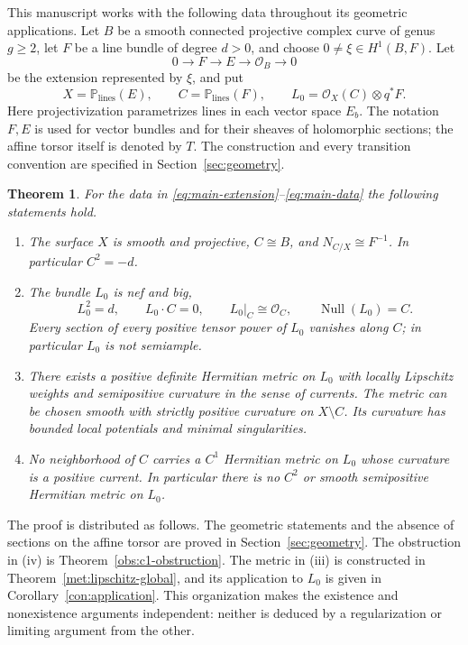 \documentclass[11pt,a4paper]{article}
\numberwithin{equation}{section}
\newtheorem{theorem}{Theorem}[section]
\theoremstyle{definition}
\theoremstyle{remark}
\renewcommand{\P}{\mathbb P}
\newcommand{\OO}{\mathcal O}
\DeclareMathOperator{\Null}{Null}
\begin{document}
This manuscript works with the following data throughout its geometric
applications. Let $B$ be a smooth connected projective complex curve of
genus $g\ge2$, let $F$ be a line bundle of degree $d>0$, and choose
$0\ne\xi\in H^1(B,F)$. Let
\begin{equation}\label{eq:main-extension}
0\longrightarrow F\longrightarrow E\longrightarrow\OO_B\longrightarrow0
\end{equation}
be the extension represented by $\xi$, and put
\begin{equation}\label{eq:main-data}
 X=\P_{\mathrm{lines}}(E),\qquad C=\P_{\mathrm{lines}}(F),\qquad
 L_0=\OO_X(C)\otimes q^*F.
\end{equation}
Here projectivization parametrizes lines in each vector space $E_b$.
The notation $F,E$ is used for vector bundles and for their sheaves of
holomorphic sections; the affine torsor itself is denoted by $T$.
The construction and every transition convention are specified in
Section~\ref{sec:geometry}.

\begin{theorem}\label{main:regularity}
For the data in \eqref{eq:main-extension}--\eqref{eq:main-data} the following
statements hold.
\begin{enumerate}[label=\textup{(\roman*)}]
\item The surface $X$ is smooth and projective, $C\cong B$, and
$N_{C/X}\cong F^{-1}$. In particular $C^2=-d$.
\item The bundle $L_0$ is nef and big,
\[
L_0^2=d,\qquad L_0\cdot C=0,\qquad
L_0|_C\cong\OO_C,\qquad \Null(L_0)=C.
\]
Every section of every positive tensor power of $L_0$ vanishes along $C$;
in particular $L_0$ is not semiample.
\item There exists a positive definite Hermitian metric on $L_0$ with
locally Lipschitz weights and semipositive curvature in the sense of
currents. The metric can be chosen smooth with strictly positive curvature
on $X\setminus C$. Its curvature has bounded local potentials and minimal
singularities.
\item No neighborhood of $C$ carries a $C^1$ Hermitian metric on $L_0$
whose curvature is a positive current. In particular there is no
$C^2$ or smooth semipositive Hermitian metric on $L_0$.
\end{enumerate}
\end{theorem}

The proof is distributed as follows. The geometric statements and the
absence of sections on the affine torsor are proved in
Section~\ref{sec:geometry}. The obstruction in (iv) is
Theorem~\ref{obs:c1-obstruction}. The metric in (iii) is constructed in
Theorem~\ref{met:lipschitz-global}, and its application to $L_0$ is given in
Corollary~\ref{con:application}. This organization makes the existence and
nonexistence arguments independent: neither is deduced by a regularization
or limiting argument from the other.
\end{document}
